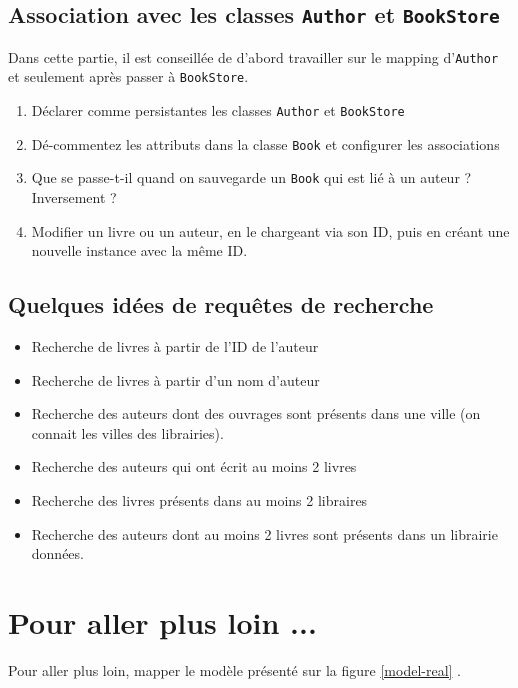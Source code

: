 \documentclass[small,algo]{dushClass} %
\begin{document}
\subsection{Association avec les classes \texttt{Author} et \texttt{BookStore}}

Dans cette partie, il est conseillée de d'abord travailler sur le mapping d'\texttt{Author} et seulement après passer à \texttt{BookStore}.\\

\begin{enumerate}
\item Déclarer comme persistantes les classes \texttt{Author} et \texttt{BookStore}
\item Dé-commentez les attributs dans la classe \texttt{Book} et configurer les associations
\item Que se passe-t-il quand on sauvegarde un \texttt{Book} qui est lié à un auteur ? Inversement ?
\item Modifier un livre ou un auteur, en le chargeant via son ID, puis en créant une nouvelle instance avec la même ID.
\end{enumerate}

\subsection{Quelques idées de requêtes de recherche}
\begin{itemize}
\item Recherche de livres à partir de l'ID de l'auteur
\item Recherche de livres à partir d'un nom d'auteur
\item Recherche des auteurs dont des ouvrages sont présents dans une ville (on connait les villes des librairies).
\item Recherche des auteurs qui ont écrit au moins 2 livres
\item Recherche des livres présents dans au moins 2 libraires
\item Recherche des auteurs dont au moins 2 livres sont présents dans un librairie données.
\end{itemize}


\section{Pour aller plus loin ...}
Pour aller plus loin, mapper le modèle présenté sur la figure \ref{model-real} .\\
\end{document}
